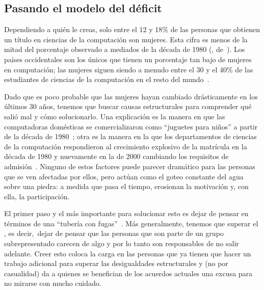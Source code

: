 \subsection*{Pasando el modelo del déficit}

Dependiendo a quién le creas,
solo entre el 12 y 18\% de las personas que obtienen un título en ciencias de la computación son mujeres.
Esta cifra es menos de la mitad del porcentaje observado a mediados de la década de 1980
(, de~\cite{Robe2017}).
Los países occidentales son los únicos que tienen un porcentaje tan bajo de mujeres en computación;
las mujeres siguen siendo a menudo entre el 30 y el 40\% de las estudiantes de ciencias de la computación en el resto del mundo~\cite{Galp2002,Varm2015}.


Dado que es poco probable que las mujeres hayan cambiado drásticamente en los últimos 30 años,
tenemos que buscar causas estructurales para comprender qué salió mal y cómo solucionarlo.
Una explicación es la manera en que las computadoras domésticas se comercializaron como ``juguetes para niños'' a partir de la década de 1980~\cite{Marg2003};
otra es la manera en la que los departamentos de ciencias de la computación respondieron al crecimiento explosivo de la matrícula
en la década de 1980 y nuevamente en la de 2000
cambiando los requisitos de admisión~\cite{Robe2017}.
Ninguno de estos factores puede parecer dramático para las personas que se ven afectadas por ellos,
pero actúan como el goteo constante del agua sobre una piedra:
a medida que pasa el tiempo, erosionan la motivación y, con ella, la participación.

El primer paso y el más importante para solucionar esto es
dejar de pensar en términos de una ``tubería con fugas''~\cite{Mill2015}.
Más generalmente,
tenemos que superar el ,
es decir,\ dejar de pensar que las personas que son parte de un grupo subrepresentado carecen de algo
y por lo tanto son responsables de no salir adelante.
Creer esto coloca la carga en las personas que ya tienen que hacer un trabajo adicional para superar las desigualdades estructurales
y (no por casualidad) da a quienes se benefician de los acuerdos actuales
una excusa para no mirarse con mucho cuidado.


